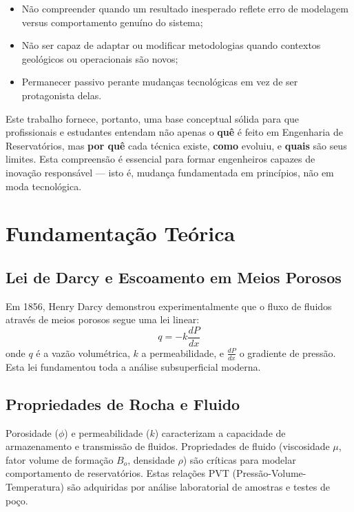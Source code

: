 \documentclass[12pt,a4paper,oneside,brazilian,sumario=tradicional]{abntex2}
\begin{document}
\begin{itemize}
  \item Não compreender quando um resultado inesperado reflete erro de modelagem versus comportamento genuíno do sistema;
  \item Não ser capaz de adaptar ou modificar metodologias quando contextos geológicos ou operacionais são novos;
  \item Permanecer passivo perante mudanças tecnológicas em vez de ser protagonista delas.
\end{itemize}

Este trabalho fornece, portanto, uma base conceptual sólida para que profissionais e estudantes entendam não apenas o \textbf{quê} é feito em Engenharia de Reservatórios, mas \textbf{por quê} cada técnica existe, \textbf{como} evoluiu, e \textbf{quais} são seus limites. Esta compreensão é essencial para formar engenheiros capazes de inovação responsável — isto é, mudança fundamentada em princípios, não em moda tecnológica.

\chapter{Fundamentação Teórica}

\section{Lei de Darcy e Escoamento em Meios Porosos}

Em 1856, Henry Darcy demonstrou experimentalmente que o fluxo de fluidos através de meios porosos segue uma lei linear:
\[
q = -k \frac{dP}{dx}
\]
onde $q$ é a vazão volumétrica, $k$ a permeabilidade, e $\frac{dP}{dx}$ o gradiente de pressão. Esta lei fundamentou toda a análise subsuperficial moderna.


\nocite{*}

\section{Propriedades de Rocha e Fluido}

Porosidade ($\phi$) e permeabilidade ($k$) caracterizam a capacidade de armazenamento e transmissão de fluidos. Propriedades de fluido (viscosidade $\mu$, fator volume de formação $B_o$, densidade $\rho$) são críticas para modelar comportamento de reservatórios. Estas relações PVT (Pressão-Volume-Temperatura) são adquiridas por análise laboratorial de amostras e testes de poço.
\end{document}
